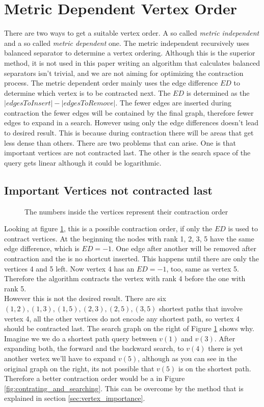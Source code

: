 \section{Metric Dependent Vertex Order}
There are two ways to get a suitable vertex order. A so called \textit{metric independent} and a so called \textit{metric dependent} one. The metric independent recursively uses balanced separator to determine a vertex ordering\cite{CCH}. Although this is the superior method, it is not used in this paper writing an algorithm that calculates balanced separators isn't trivial, and we are not aiming for optimizing the contraction process. 
The metric dependent order mainly uses the edge difference $ED$ to determine which vertex is to be contracted next. The $ED$ is determined as the $|edges To Insert| - |edges To Remove|$. The fewer edges are inserted during contraction the fewer edges will be contained by the final graph, therefore fewer edges to expand in a search. However using only the edge differences doesn't lead to desired result. This is because during contraction there will be areas that get less dense than others. 
There are two problems that can arise. One is that important vertices are not contracted last. The other is the search space of the query gets linear although it could be logarithmic.

\subsection{Important Vertices not contracted last}\label{sec:not_contracted_last}

\begin{figure}
    \centering
    
    \caption{The numbers inside the vertices represent their contraction order}
    \label{fig:not_contracted_last}
\end{figure}

Looking at figure \ref{fig:not_contracted_last}, this is a possible contraction order, if only the $ED$ is used to contract vertices. At the beginning the nodes with rank 1, 2, 3, 5 have the same edge difference, which is $ED = -1$. One edge after another will be removed after contraction and the is no shortcut inserted. This happens until there are only the vertices 4 and 5 left. Now vertex 4 has an $ED=-1$, too, same as vertex 5. Therefore the algorithm contracts the vertex with rank 4 before the one with rank 5. \\
However this is not the desired result. There are six ${(1,2), (1,3), (1,5), (2,3), (2,5), (3,5)}$ shortest paths that involve vertex 4, all the other vertices do not encode any shortest path, so vertex 4 should be contracted last. The search graph on the right of Figure \ref{fig:not_contracted_last} shows why. Imagine we we do a shortest path query between $v(1)$ and $v(3)$. After expanding both, the forward and the backward search, to $v(4)$ there is yet another vertex we'll have to expand $v(5)$, although 
as you can see in the original graph on the right, its not possible that $v(5)$ is on the shortest path. Therefore a better contraction order would be a in Figure \ref{fig:contrating_and_searching}.  This can be overcome by the method that is explained in section \ref{sec:vertex_importance}.

